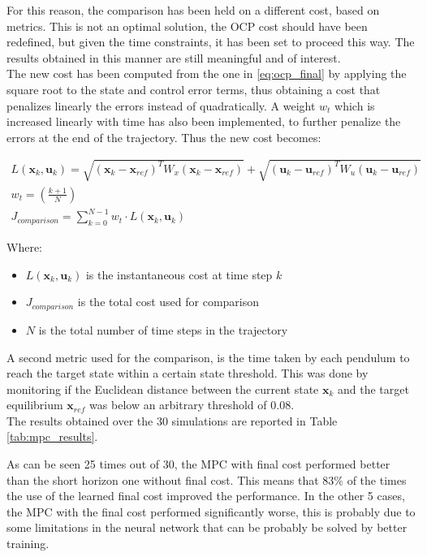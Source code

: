 For this reason, the comparison has been held on a different cost, based on  metrics. This is not an optimal solution, the OCP cost should have been redefined, but given the time constraints, it has been set to proceed this way. The results obtained in this manner are still meaningful and of interest.\\

\noindent The new cost has been computed from the one in \eqref{eq:ocp_final} by applying the square root to the state and control error terms, thus obtaining a cost that penalizes linearly the errors instead of quadratically. A weight $w_t$ which is increased linearly with time has also been implemented, to further penalize the errors at the end of the trajectory. Thus the new cost becomes:

\begin{gather}
\label{eq:realized_cost_metrics}
    L(\mathbf{x}_k, \mathbf{u}_k) = \sqrt{(\mathbf{x}_k - \mathbf{x}_{ref})^T W_x (\mathbf{x}_k - \mathbf{x}_{ref})} + \sqrt{(\mathbf{u}_k - \mathbf{u}_{ref})^T W_u (\mathbf{u}_k - \mathbf{u}_{ref})} \\[10pt]
    w_t = \left( \frac{k+1}{N} \right) \\[10pt]
    J_{comparison} = \sum_{k=0}^{N-1}  w_t\cdot L(\mathbf{x}_k, \mathbf{u}_k)
\end{gather}

\noindent Where:
\begin{itemize}[noitemsep]
    \item \(L(\mathbf{x}_k, \mathbf{u}_k)\) is the instantaneous cost at time step \(k\)
    \item \(J_{comparison}\) is the total cost used for comparison
    \item \(N\) is the total number of time steps in the trajectory
\end{itemize}

\noindent A second metric used for the comparison, is the time taken by each pendulum to reach the target state within a certain state threshold. This was done by monitoring if the Euclidean distance between the current state $\mathbf{x}_k$ and the target equilibrium $\mathbf{x}_{ref}$ was below an arbitrary threshold of $0.08$.\\

\noindent The results obtained over the 30 simulations are reported in Table \ref{tab:mpc_results}.


\noindent As can be seen 25 times out of 30, the MPC with final cost performed better than the short horizon one without final cost. This means that $83\%$ of the times the use of the learned final cost improved the performance. In the other 5 cases, the MPC with the final cost performed significantly worse, this is probably due to some limitations in the neural network that can be probably be solved by better training.\\

